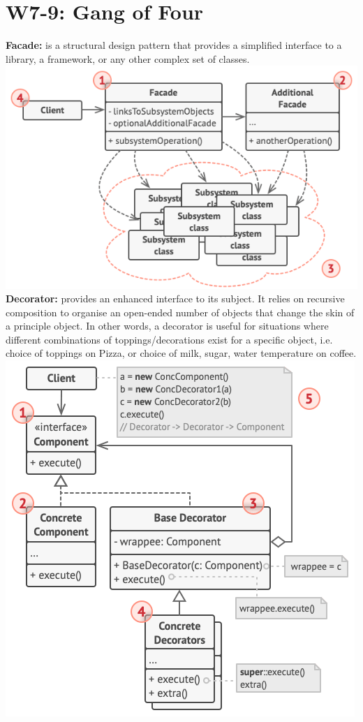 \section{W7-9: Gang of Four}
\textbf{Facade:} is a structural design pattern that provides a simplified interface to a library, a framework, or any other complex set of classes.\\
\includegraphics[width=\linewidth]{figs/facade.png}\\
\textbf{Decorator:} provides an enhanced interface to its subject. It relies on recursive composition to organise an open-ended number of objects that change the skin of a principle object. In other words, a decorator is useful for situations where different combinations of toppings/decorations exist for a specific object, i.e. choice of toppings on Pizza, or choice of milk, sugar, water temperature on coffee.\\
\includegraphics[width=\linewidth]{figs/decorator.png}\\
